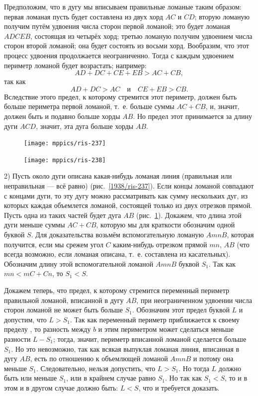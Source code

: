 \documentclass[oneside]{book}
\begin{document}
Предположим, что в дугу мы вписываем правильные ломаные таким образом:
первая ломаная пусть будет составлена из двух хорд $AC$ и $CD$;
вторую ломаную получим путём удвоения числа сторон первой ломаной;
это будет ломаная $ADCEB$, состоящая из четырёх хорд;
третью ломаную получим удвоением числа сторон второй ломаной;
она будет состоять из восьми хорд.
Вообразим, что этот процесс удвоения продолжается неограниченно.
Тогда с каждым удвоением периметр ломаной будет возрастать;
например:
\[AD+DC+CE+EB>AC+CB,\]
так как
\[AD+DC>AC\quad\text{и}\quad CE+EB>CB.\]
Вследствие этого предел, к которому стремится этот периметр, должен быть больше периметра первой ломаной, т.~е. больше суммы $AC+CB$, и, значит, должен быть и подавно больше хорды $AB$.
Но предел этот принимается за длину дуги $ACD$, значит, эта дуга больше хорды $AB$.

\begin{figure}
\vskip-5mm
\centering
\texttt{[image: mppics/ris-237]}
\caption{}\label{1938/ris-237}
\bigskip
\texttt{[image: mppics/ris-238]}
\caption{}\label{1938/ris-238}
\end{figure}

2) Пусть около дуги описана какая-нибудь ломаная линия (правильная или неправильная — всё равно) (рис.~\ref{1938/ris-237}).
Если концы ломаной совпадают с концами дуги, то эту дугу можно рассматривать как сумму нескольких дуг, из которых каждая объемлется ломаной, состоящей только из двух отрезков прямой.
Пусть одна из таких частей будет дуга $AB$ (рис.~\ref{1938/ris-238}).
Докажем, что длина этой дуги меньше суммы $AC+CB$, которую мы для краткости обозначим одной буквой $S$.
Для доказательства возьмём вспомогательную ломаную $AmnB$, которая получится, если мы срежем угол $C$ каким-нибудь отрезком прямой $mn$,  $AB$ (что всегда возможно, если ломаная описана, т.~е. составлена из касательных).
Обозначим длину этой вспомогательной ломаной $AmnB$ буквой $S_1$.
Так как $mn<mC+Cn$, то $S_1<S$.

Докажем теперь, что предел, к которому стремится переменный периметр правильной ломаной, вписанной в дугу $AB$, при неограниченном удвоении числа сторон ломаной не может быть больше $S_1$.
Обозначим этот предел буквой $L$ и допустим, что $L>S_1$.
Так как переменный периметр приближается к своему пределу , то разность между $b$ и этим периметром может сделаться меньше разности $L-S_1$; тогда, значит, периметр вписанной ломаной сделается больше $S_1$.
Но это невозможно, так как всякая выпуклая ломаная линия, вписанная в дугу $AB$, есть  по отношению к объемлющей ломаной $AmnB$ и потому она меньше $S_1$.
Следовательно, нельзя допустить, что $L>S_1$.
Но тогда $L$ должно быть или меньше $S_1$, или в крайнем случае равно $S_1$.
Но так как $S_1<S$, то и в этом и в другом случае должно быть:
$L<S$, что и требуется доказать.
\end{document}
